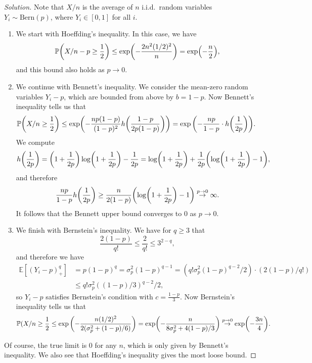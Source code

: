 \documentclass{article}
\theoremstyle{plain}
\theoremstyle{remark}
\newenvironment{solution}{\begin{proof}[Solution]\renewcommand\qedsymbol{}}{\end{proof}}
\newcommand{\Bb}{\mathbb}
\newcommand{\Rm}{\mathrm}
\newcommand{\PP}{\Bb P}
\newcommand{\EE}{\Bb E}
\begin{document}
\begin{solution}
	Note that $X/n$ is the average of $n$ i.i.d.\ random variables $Y_i \sim \Rm{Bern}(p)$, where $Y_i \in [0, 1]$ for all $i$.  
	\begin{enumerate}
		\item 

	We start with Hoeffding's inequality. In this case, we have
	\[
	\PP\qty(X/n - p \geq \frac12) \leq \exp(-\frac{2n^2(1/2)^2}{n}) = \exp(- \frac n2),
	\]
	and this bound also holds as $p \to 0$. 
	
\item 	We continue with Bennett's inequality. We consider the mean-zero random variables $Y_i - p$, which are bounded from above by $b = 1 - p$. Now Bennett's inequality tells us that
	\begin{align*}
		\PP\qty(X/n \geq \frac12) &\leq \exp(- \frac{np(1-p)}{(1-p)^2} h\qty(\frac{1-p}{2p(1-p)})) = \exp\qty( -\frac{np}{1-p} \cdot  h\qty(\frac{1}{2p})).
	\end{align*}
We compute
\[
h\qty(\frac1{2p}) = \qty(1 + \frac1{2p}) \log(1 + \frac1{2p}) - \frac1{2p} = \log(1 + \frac1{2p}) + \frac1{2p} \qty(\log(1 + \frac1{2p}) - 1),
\]
and therefore
\[
\frac{np}{1-p} h\qty(\frac1{2p}) \geq  \frac{n}{2(1-p)} \qty(\log(1 + \frac1{2p}) - 1) \overset{p \to 0}\to \infty. 
\]
It follows that the Bennett upper bound converges to 0 as $p \to 0$. 
	

\item We finish with Bernstein's inequality.  We have for $q \geq 3$ that
\[
\frac{2(1-p)}{q!} \leq \frac2{q!} \leq 3^{2-q}, 
\]
and therefore we have
\begin{align*}
	\EE[(Y_i - p)_+^q] &= p(1-p)^q = \sigma_p^2 (1-p)^{q-1} = (q! \sigma_p^2 (1-p)^{q-2}/2)\cdot (2(1-p)/q!) \\
	&\leq q!\sigma_p^2 ((1-p)/3)^{q-2}/2,
\end{align*}
so $Y_i - p$ satisfies Bernstein's condition with $c = \frac{1-p}{3}$.
Now Bernstein's inequality tells us that
\[
\PP(X/n \geq \frac12 \leq \exp\qty(- \frac{n(1/2)^2}{2(\sigma_p^2 + (1-p)/6)}) = \exp(- \frac{n}{8\sigma_p^2 + 4(1-p)/3}) \overset{p \to 0}{\to} \exp(-\frac{3n}{4}). \]
	\end{enumerate}
Of course, the true limit is 0 for any $n$, which is only given by Bennett's inequality. We also see that Hoeffding's inequality gives the most loose bound. 

\end{solution}
\end{document}
